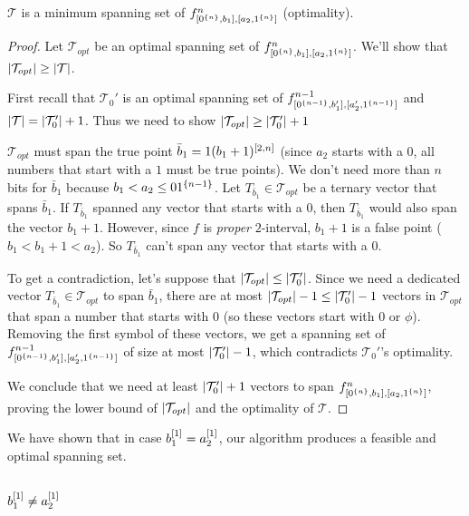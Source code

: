 \begin{theorem}
$\mathcal{T}$ is a minimum spanning set of
$f^{n}_{[0^{\{n\}}, b_1], [a_2, 1^{\{n\}}]}$ (optimality).
\end{theorem}

\begin{proof}
Let $\mathcal{T}_{opt}$ be an optimal spanning set of
$f^{n}_{[0^{\{n\}}, b_1], [a_2, 1^{\{n\}}]}$.
We'll show that
$\lvert\mathcal{T}_{opt}\rvert \geq \lvert\mathcal{T}\rvert$.

First recall that
$\mathcal{T}_0'$ is an optimal spanning set of
$f^{n-1}_{[0^{\{n-1\}}, b_1'], [a_2', 1^{\{n-1\}}]}$
and
$\lvert\mathcal{T}\rvert = \lvert\mathcal{T}_0'\rvert + 1$.
Thus we need to show
$\lvert\mathcal{T}_{opt}\rvert \geq \lvert\mathcal{T}_0'\rvert + 1$

$\mathcal{T}_{opt}$ must span the true point
$\bar{b}_1 = 1 (b_1 + 1)^{[2, n]}$
(since $a_2$ starts with a $0$,
all numbers that start with a $1$ must be true points).
We don't need more than $n$ bits for $\bar{b}_1$
because $b_1 < a_2 \leq 0 1^{\{n-1\}}$.
Let $T_{\bar{b}_1} \in \mathcal{T}_{opt}$
be a ternary vector that spans $\bar{b}_1$.
If $T_{\bar{b}_1}$ spanned
any vector that starts with a $0$,
then $T_{\bar{b}_1}$ would also span
the vector $b_1 + 1$.
However,
since $f$ is \emph{proper} $2$-interval,
$b_1 + 1$ is a false point ($b_1 < b_1 + 1 < a_2$).
So $T_{\bar{b}_1}$
can't span any vector that starts with a $0$.

To get a contradiction,
let's suppose that
$\lvert\mathcal{T}_{opt}\rvert \leq \lvert\mathcal{T}_0'\rvert$.
Since we need a dedicated vector
$T_{\bar{b}_1} \in \mathcal{T}_{opt}$ to span $\bar{b}_1$,
there are at most
$\lvert\mathcal{T}_{opt}\rvert - 1
\leq \lvert\mathcal{T}_0'\rvert - 1$
vectors in $\mathcal{T}_{opt}$ that span a number
that starts with $0$
(so these vectors start with $0$ or $\phi$).
Removing the first symbol of these vectors,
we get a spanning set of
$f^{n-1}_{[0^{\{n-1\}}, b_1'], [a_2', 1^{\{n-1\}}]}$
of size at most $\lvert\mathcal{T}_0'\rvert - 1$,
which contradicts $\mathcal{T}_0'$'s optimality.

We conclude that we need at least
$\lvert\mathcal{T}_0'\rvert + 1$ vectors to span
$f^{n}_{[0^{\{n\}}, b_1], [a_2, 1^{\{n\}}]}$,
proving the lower bound of
$\lvert\mathcal{T}_{opt}\rvert$
and the optimality of $\mathcal{T}$.
\end{proof}


We have shown that in case $b_1^{[1]} = a_2^{[1]}$,
our algorithm produces a feasible and optimal spanning set.

\subsection{\texorpdfstring{$b_1^{[1]}
\neq a_2^{[1]}$}
{ \textneq{} }
}


